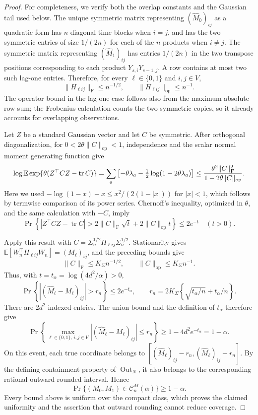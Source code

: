 \documentclass{article}
\begin{document}
\begin{proof}
For completeness, we verify both the overlap constants and the Gaussian
tail used below. The unique symmetric matrix representing
\((\widehat M_0)_{ij}\) as a quadratic form has \(n\) diagonal time blocks
when \(i=j\), and has the two symmetric entries of size \(1/(2n)\) for each
of the \(n\) products when \(i\ne j\). The symmetric matrix representing
\((\widehat M_1)_{ij}\) has entries \(1/(2n)\) in the two transpose
positions corresponding to each product
\(Y_{s,i}Y_{s-1,j}\). A row contains at most two such lag-one entries.
Therefore, for every \(\ell\in\{0,1\}\) and \(i,j\in V\),
\[
 \lVert H_{\ell ij}\rVert_{\mathrm F}\le n^{-1/2},
 \qquad
 \lVert H_{\ell ij}\rVert_{\mathrm{op}}\le n^{-1}.
\]
The operator bound in the lag-one case follows also from the maximum
absolute row sum; the Frobenius calculation counts the two symmetric
copies, so it already accounts for overlapping observations.

Let \(Z\) be a standard Gaussian vector and let \(C\) be symmetric. After
orthogonal diagonalization, for
\(0<2\theta\lVert C\rVert_{\mathrm{op}}<1\), independence and the scalar
normal moment generating function give
\[
 \log\mathbb E\exp\{\theta(Z^\top CZ-\operatorname{tr}C)\}
 =\sum_a\left[-\theta\lambda_a-\tfrac12\log(1-2\theta\lambda_a)\right]
 \le {\theta^2\lVert C\rVert_{\mathrm F}^2
       \over1-2\theta\lVert C\rVert_{\mathrm{op}}}.
\]
Here we used
\(-\log(1-x)-x\le x^2/(2(1-|x|))\) for \(|x|<1\), which follows by
termwise comparison of its power series. Chernoff's inequality, optimized
in \(\theta\), and the same calculation with \(-C\), imply
\[
 \Pr\left\{|Z^\top CZ-\operatorname{tr}C|>
 2\lVert C\rVert_{\mathrm F}\sqrt t+
 2\lVert C\rVert_{\mathrm{op}}t\right\}\le2e^{-t}
 \quad(t>0).
\]

Apply this result with
\(C=\Sigma_n^{1/2}H_{\ell ij}\Sigma_n^{1/2}\). Stationarity gives
\(\mathbb E[W_n^\top H_{\ell ij}W_n]=(M_\ell)_{ij}\), and the preceding
bounds give
\[
 \lVert C\rVert_{\mathrm F}\le K_\Sigma n^{-1/2},
 \qquad
 \lVert C\rVert_{\mathrm{op}}\le K_\Sigma n^{-1}.
\]
Thus, with \(t=t_\alpha=\log(4d^2/\alpha)>0\),
\[
 \Pr\left\{|(\widehat M_\ell-M_\ell)_{ij}|>r_n\right\}
 \le2e^{-t_\alpha},
 \qquad
 r_n=2K_\Sigma\left\{\sqrt{t_\alpha/n}+t_\alpha/n\right\}.
\]
There are \(2d^2\) indexed entries. The union bound and the definition of
\(t_\alpha\) therefore give
\[
 \Pr\left\{\max_{\ell\in\{0,1\},\,i,j\in V}
 |(\widehat M_\ell-M_\ell)_{ij}|\le r_n\right\}
 \ge1-4d^2e^{-t_\alpha}=1-\alpha.
\]
On this event, each true coordinate belongs to
\([ (\widehat M_\ell)_{ij}-r_n,
    (\widehat M_\ell)_{ij}+r_n ]\). By the defining containment property of
\(\operatorname{Out}_N\), it also belongs to the corresponding rational
outward-rounded interval. Hence
\[
 \Pr\{(M_0,M_1)\in\mathcal C_n^M(\alpha)\}\ge1-\alpha.
\]
Every bound above is uniform over the compact class, which proves the
claimed uniformity and the assertion that outward rounding cannot reduce
coverage.
\end{proof}
\end{document}
